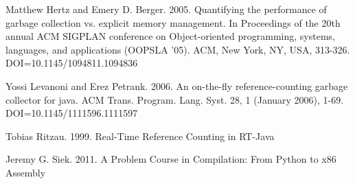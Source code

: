 \documentclass{sigplanconf}
\begin{document}
\begin{thebibliography}{}
Matthew Hertz and Emery D. Berger. 2005. Quantifying the performance of garbage collection vs. explicit memory management. In Proceedings of the 20th annual ACM SIGPLAN conference on Object-oriented programming, systems, languages, and applications (OOPSLA '05). ACM, New York, NY, USA, 313-326. DOI=10.1145/1094811.1094836  

Yossi Levanoni and Erez Petrank. 2006. An on-the-fly reference-counting garbage collector for java. ACM Trans. Program. Lang. Syst. 28, 1 (January 2006), 1-69. DOI=10.1145/1111596.1111597 

Tobias Ritzau. 1999.  Real-Time Reference Counting in RT-Java

Jeremy G. Siek. 2011.  A Problem Course in Compilation: From Python to x86 Assembly

\end{thebibliography}
\end{document}
